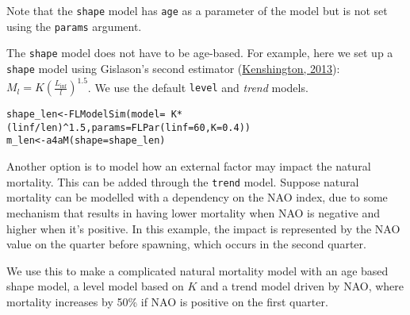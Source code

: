 \documentclass[a4paper,english,10pt]{article}\usepackage[]{graphicx}\usepackage[]{color}
\makeatletter
\newcommand{\hlnum}[1]{\textcolor[rgb]{0.2,0.2,0.2}{#1}}%
\newcommand{\hlopt}[1]{\textcolor[rgb]{0.2,0.2,0.2}{#1}}%
\newcommand{\hlstd}[1]{\textcolor[rgb]{0,0,0}{#1}}%
\newcommand{\hlkwb}[1]{\textcolor[rgb]{0.361,0.506,0.596}{#1}}%
\newcommand{\hlkwc}[1]{\textcolor[rgb]{0.361,0.506,0.596}{#1}}%
\newcommand{\hlkwd}[1]{\textcolor[rgb]{0.361,0.506,0.596}{#1}}%
\newenvironment{kframe}{%
 \def\at@end@of@kframe{}%
 \ifinner\ifhmode%
  \def\at@end@of@kframe{\end{minipage}}%
  \begin{minipage}{\columnwidth}%
 \fi\fi%
 \def\FrameCommand##1{\hskip\@totalleftmargin \hskip-\fboxsep
 \colorbox{shadecolor}{##1}\hskip-\fboxsep
     \hskip-\linewidth \hskip-\@totalleftmargin \hskip\columnwidth}%
 \MakeFramed {\advance\hsize-\width
   \@totalleftmargin\z@ \linewidth\hsize
   \@setminipage}}%
 {\par\unskip\endMakeFramed%
 \at@end@of@kframe}
\newenvironment{knitrout}{}{} %
\newcommand{\code}[1]{{\texttt{#1}}}
\newcommand{\class}[1]{{\textit{#1}}}
\makeatother
\begin{document}
Note that the \code{shape} model has \code{age} as a parameter of the model but is not set using the \code{params} argument.

The \code{shape} model does not have to be age-based. For example, here we set up a \code{shape} model using Gislason's second estimator (\href{}{Kenshington, 2013}):
$M_l=K(\frac{L_{\inf}}{l})^{1.5}$. We use the default \code{level} and \class{trend} models.

\begin{knitrout}
\color{fgcolor}\begin{kframe}
\begin{alltt}
\hlstd{shape_len} \hlkwb{<-} \hlkwd{FLModelSim}\hlstd{(}\hlkwc{model}\hlstd{=}\hlopt{~}\hlstd{K}\hlopt{*}\hlstd{(linf}\hlopt{/}\hlstd{len)}\hlopt{^}\hlnum{1.5}\hlstd{,} \hlkwc{params}\hlstd{=}\hlkwd{FLPar}\hlstd{(}\hlkwc{linf}\hlstd{=}\hlnum{60}\hlstd{,} \hlkwc{K}\hlstd{=}\hlnum{0.4}\hlstd{))}
\hlstd{m_len} \hlkwb{<-} \hlkwd{a4aM}\hlstd{(}\hlkwc{shape}\hlstd{=shape_len)}
\end{alltt}
\end{kframe}
\end{knitrout}

Another option is to model how an external factor may impact the natural mortality. This can be added through the \code{trend} model. Suppose natural mortality can be modelled with a dependency on the NAO index, due to some mechanism that results in having lower mortality when NAO is negative and higher when it's positive. In this example, the impact is represented by the NAO value on the quarter before spawning, which occurs in the second quarter. 

We use this to make a complicated natural mortality model with an age based shape model, a level model based on $K$ and a trend model driven by NAO, where mortality increases by 50\% if NAO is positive on the first quarter.
\end{document}
